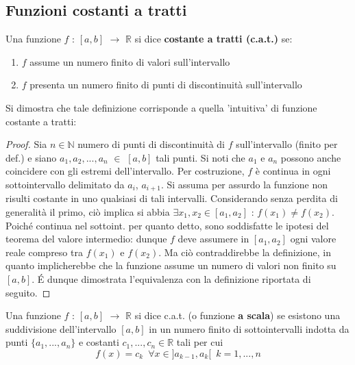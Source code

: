 \documentclass[10pt]{article}
\theoremstyle{plain}
\begin{document}
\subsection{Funzioni costanti a tratti}
\begin{defin}
    Una funzione $f$ : $[a,b]$ $\rightarrow$ $\mathbb{R}$ si dice \textbf{costante a tratti (c.a.t.)} se:
    \begin{enumerate}
        \item $f$ assume un numero finito di valori sull'intervallo
        \item $f$ presenta un numero finito di punti di discontinuità sull'intervallo
    \end{enumerate}
\end{defin}
Si dimostra che tale definizione corrisponde a quella 'intuitiva' di funzione costante a tratti:
\begin{proof}
    Sia $n \in \mathbb{N}$ numero di punti di discontinuità di $f$ sull'intervallo (finito per def.) e siano $a_1, a_2, ..., a_n$ $\in$ $[a,b]$ tali punti. Si noti che $a_1$ e $a_n$ possono anche coincidere con gli estremi dell'intervallo. Per costruzione, $f$ è continua in ogni sottointervallo delimitato da $a_i$, $a_{i+1}$. Si assuma per assurdo la funzione non risulti costante in uno qualsiasi di tali intervalli. Considerando senza perdita di generalità il primo, ciò implica si abbia $\exists x_1, x_2 \in [a_1, a_2]$ : $f(x_1) \neq f(x_2)$. Poiché continua nel sottoint. per quanto detto, sono soddisfatte le ipotesi del teorema del valore intermedio: dunque $f$ deve assumere in $[a_1, a_2]$ ogni valore reale compreso tra $f(x_1)$ e $f(x_2)$. Ma ciò contraddirebbe la definizione, in quanto implicherebbe che la funzione assume un numero di valori non finito su $[a,b]$. \'E dunque dimostrata l'equivalenza con la definizione riportata di seguito.
\end{proof}
\begin{defin}
    Una funzione $f$ : $[a,b]$ $\rightarrow$ $\mathbb{R}$ si dice c.a.t. (o funzione \textbf{a scala}) se esistono una suddivisione dell'intervallo $[a,b]$ in un numero finito di sottointervalli indotta da punti $\{a_1, ..., a_n\}$ e costanti $c_1, ..., c_n \in \mathbb{R}$ tali per cui
    \[f(x) = c_k \enspace \forall x \in ]a_{k-1}, a_k[ \enspace k=1, ..., n\]
\end{defin}
\end{document}
